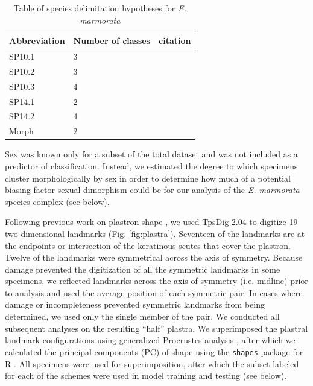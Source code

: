 \documentclass[10pt,letterpaper]{article}
\begin{document}
\begin{table}
  \centering
    \caption{Table of species delimitation hypotheses for \textit{E. marmorata}}
    \begin{tabular}{l l l }
      \hline
      Abbreviation & Number of classes & citation \\
      \hline
      SP10.1 & 3 & \cite{Spinks2010} \\
      SP10.2 & 3 & \cite{Spinks2010} \\
      SP10.3 & 4 & \cite{Spinks2010} \\
      SP14.1 & 2 & \cite{Spinks2014} \\
      SP14.2 & 4 & \cite{Spinks2014} \\
      Morph & 2 & \cite{Spinks2010} \\
      \hline
    \end{tabular}
    \label{tab:hypotheses}
\end{table}

Sex was known only for a subset of the total dataset and was not included as a predictor of classification. Instead, we estimated the degree to which specimens cluster morphologically by sex in order to determine how much of a potential biasing factor sexual dimorphism could be for our analysis of the \textit{E. marmorata} species complex (see below).

Following previous work on plastron shape \cite{Angielczyk2007,Angielczyk2011,Angielczyk2013a}, we used TpsDig 2.04 \cite{Rohlf2005} to digitize 19 two-dimensional landmarks (Fig. \ref{fig:plastra}). Seventeen of the landmarks are at the endpoints or intersection of the keratinous scutes that cover the plastron. Twelve of the landmarks were symmetrical across the axis of symmetry. Because damage prevented the digitization of all the symmetric landmarks in some specimens, we reflected landmarks across the axis of symmetry (i.e. midline) prior to analysis and used the average position of each symmetric pair. In cases where damage or incompleteness prevented symmetric landmarks from being determined, we used only the single member of the pair. We conducted all subsequent analyses on the resulting ``half'' plastra. We superimposed the plastral landmark configurations using generalized Procrustes analysis \cite{Dryden1998a}, after which we calculated the principal components (PC) of shape using the \texttt{shapes} package for R \cite{R2016,Dryden2013}. All specimens were used for superimposition, after which the subset labeled for each of the schemes were used in model training and testing (see below).
\end{document}
